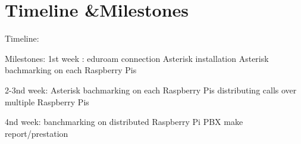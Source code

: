 \section{Timeline \&Milestones}	\label{sec:timeline-milestone}

	Timeline:
		
	

	Milestones:
	1st week : 
		eduroam connection
		Asterisk installation
		Asterisk bachmarking on each Raspberry Pis
		
	2-3nd week:
		Asterisk bachmarking on each Raspberry Pis
		distributing calls over multiple Raspberry Pis

	4nd week:
		banchmarking on distributed Raspberry Pi PBX
		make report/prestation 